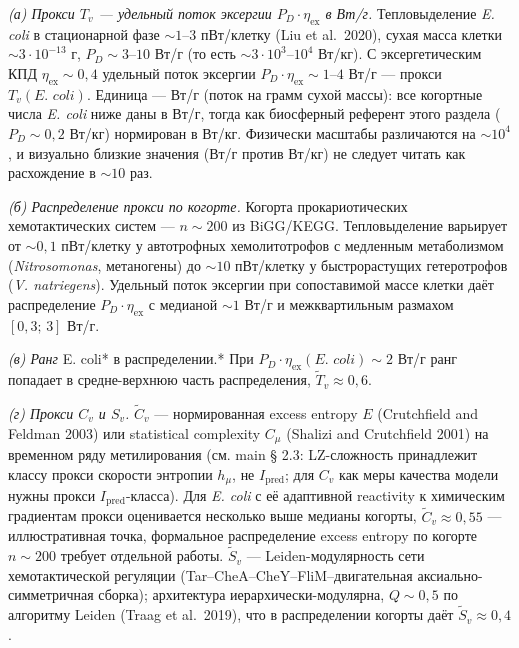 \documentclass[pdflatex,sn-mathphys-ay]{sn-jnl}
\begin{document}
\emph{(а) Прокси \(T_v\) --- удельный поток эксергии \(P_D \cdot \eta_{\text{ex}}\) в Вт/г.} Тепловыделение \emph{E. coli} в стационарной фазе \(\sim 1\)--\(3\) пВт/клетку (Liu et al.~2020), сухая масса клетки \(\sim 3 \cdot 10^{-13}\) г, \(P_D \sim 3\)--\(10\) Вт/г (то есть \(\sim 3 \cdot 10^{3}\)--\(10^{4}\) Вт/кг). С эксергетическим КПД \(\eta_{\text{ex}} \sim 0{,}4\) удельный поток эксергии \(P_D \cdot \eta_{\text{ex}} \sim 1\)--\(4\) Вт/г --- прокси \(T_v(\textit{E. coli})\). Единица --- Вт/г (поток на грамм сухой массы): все когортные числа \emph{E. coli} ниже даны в Вт/г, тогда как биосферный референт этого раздела (\(P_D \sim 0{,}2\) Вт/кг) нормирован в Вт/кг. Физически масштабы различаются на \(\sim\!10^{4}\), и визуально близкие значения (Вт/г против Вт/кг) не следует читать как расхождение в \(\sim\!10\) раз.

\emph{(б) Распределение прокси по когорте.} Когорта прокариотических хемотактических систем --- \(n \sim 200\) из BiGG/KEGG. Тепловыделение варьирует от \(\sim 0{,}1\) пВт/клетку у автотрофных хемолитотрофов с медленным метаболизмом (\emph{Nitrosomonas}, метаногены) до \(\sim 10\) пВт/клетку у быстрорастущих гетеротрофов (\emph{V. natriegens}). Удельный поток эксергии при сопоставимой массе клетки даёт распределение \(P_D \cdot \eta_{\text{ex}}\) с медианой \(\sim 1\) Вт/г и межквартильным размахом \([0{,}3;\, 3]\) Вт/г.

\emph{(в) Ранг }E. coli* в распределении.* При \(P_D \cdot \eta_{\text{ex}}(\textit{E. coli}) \sim 2\) Вт/г ранг попадает в средне-верхнюю часть распределения, \(\tilde{T}_v \approx 0{,}6\).

\emph{(г) Прокси \(C_v\) и \(S_v\).} \(\tilde{C}_v\) --- нормированная excess entropy \(E\) (Crutchfield and Feldman 2003) или statistical complexity \(C_\mu\) (Shalizi and Crutchfield 2001) на временном ряду метилирования (см. main § 2.3: LZ-сложность принадлежит классу прокси скорости энтропии \(h_\mu\), не \(I_{\text{pred}}\); для \(C_v\) как меры качества модели нужны прокси \(I_{\text{pred}}\)-класса). Для \emph{E. coli} с её адаптивной reactivity к химическим градиентам прокси оценивается несколько выше медианы когорты, \(\tilde{C}_v \approx 0{,}55\) --- иллюстративная точка, формальное распределение excess entropy по когорте \(n \sim 200\) требует отдельной работы. \(\tilde{S}_v\) --- Leiden-модулярность сети хемотактической регуляции (Tar--CheA--CheY--FliM--двигательная аксиально-симметричная сборка); архитектура иерархически-модулярна, \(Q \sim 0{,}5\) по алгоритму Leiden (Traag et al.~2019), что в распределении когорты даёт \(\tilde{S}_v \approx 0{,}4\).
\end{document}
